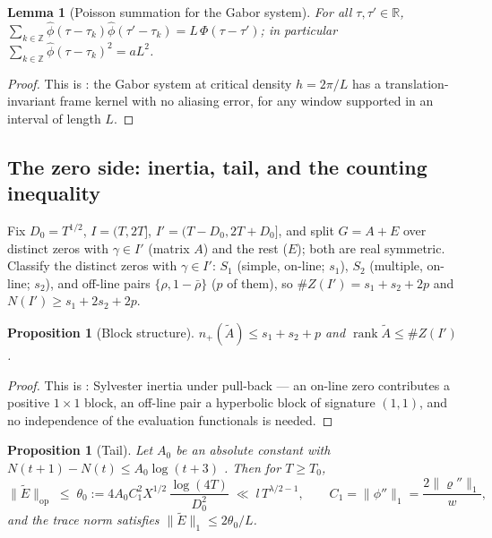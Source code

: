 \documentclass[11pt]{article}
\numberwithin{equation}{section}
\newtheorem{lemma}[theorem]{Lemma}
\newtheorem{proposition}[theorem]{Proposition}
\theoremstyle{definition}
\theoremstyle{remark}
\begin{document}
\begin{lemma}[Poisson summation for the Gabor
system]\label{l:gabor}
For all $\tau,\tau'\in\mathbb R$,
$\sum_{k\in\mathbb Z}\widehat\phi(\tau-\tau_k)
\widehat\phi(\tau'-\tau_k)=L\,\Phi(\tau-\tau')$; in
particular $\sum_{k\in\mathbb Z}
\widehat\phi(\tau-\tau_k)^{2}=aL^{2}$.
\end{lemma}

\begin{proof}
This is \cite[Lem.~2.2]{C26}: the Gabor system at critical
density $h=2\pi/L$ has a translation-invariant frame kernel
with no aliasing error, for any window supported in an interval
of length $L$.
\end{proof}

\subsection{The zero side: inertia, tail, and the counting
inequality}\label{s:frame:count}

Fix $D_0=T^{1/2}$, $I=(T,2T]$, $I'=(T-D_0,2T+D_0]$, and split
$G=A+E$ over distinct zeros with $\gamma\in I'$ (matrix $A$)
and the rest ($E$); both are real symmetric. Classify the
distinct zeros with $\gamma\in I'$: $S_1$ (simple, on-line;
$s_1$), $S_2$ (multiple, on-line; $s_2$), and off-line pairs
$\{\rho,1-\bar\rho\}$ ($p$ of them), so
$\#Z(I')=s_1+s_2+2p$ and $N(I')\ge s_1+2s_2+2p$.

\begin{proposition}[Block structure]\label{p:inertiaA}
$n_+(\widetilde A)\le s_1+s_2+p$ and
$\operatorname{rank}\widetilde A\le\#Z(I')$.
\end{proposition}

\begin{proof}
This is \cite[Prop.~4.1]{C26}: Sylvester inertia under
pull-back --- an on-line zero contributes a positive $1\times1$
block, an off-line pair a hyperbolic block of signature $(1,1)$,
and no independence of the evaluation functionals is needed.
\end{proof}

\begin{proposition}[Tail]\label{p:tail}
Let $A_0$ be an absolute constant with
$N(t+1)-N(t)\le A_0\log(t+3)$ \cite[Thm.~9.2]{Tit86}. Then
for $T\ge T_0$,
\[
\|\widetilde E\|_{\mathrm{op}}\;\le\;\theta_0
:=4A_0C_1^{2}X^{1/2}\,\frac{\log(4T)}{D_0^{2}}
\;\ll\;l\,T^{\lambda/2-1},
\qquad C_1=\|\phi''\|_1=\frac{2\|\varrho''\|_1}{w},
\]
and the trace norm satisfies
$\|\widetilde E\|_1\le2\theta_0/L$.
\end{proposition}
\end{document}
